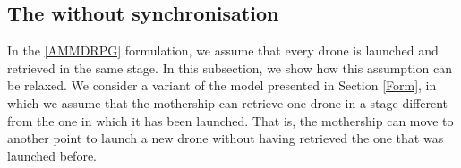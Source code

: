 \subsection{The \AMD\xspace without synchronisation}\label{amdasyn}
\noindent
In the \eqref{AMMDRPG} formulation, we assume that every drone is launched and retrieved in the same stage. In this subsection, we show how this assumption can be relaxed.
We consider a variant of the model presented in Section \ref{Form}, in which we assume that the mothership can retrieve one drone in a stage different from the one in which it has been launched. That is, the mothership can move to another point to launch a new drone without having  retrieved the one that was launched before.



